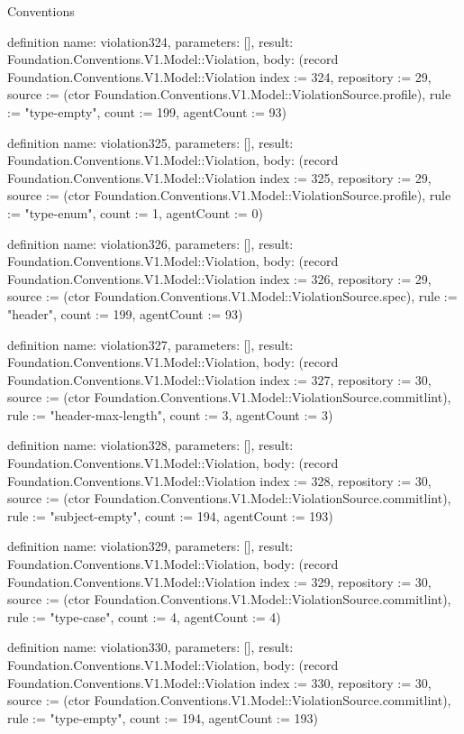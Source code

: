 \begin{lexlean}{Conventions}
\begin{semanticmodule}
definition{
  name: violation324,
  parameters: [],
  result: Foundation.Conventions.V1.Model::Violation,
  body: (record Foundation.Conventions.V1.Model::Violation {index := 324, repository := 29, source := (ctor Foundation.Conventions.V1.Model::ViolationSource.profile), rule := "type-empty", count := 199, agentCount := 93})
}

definition{
  name: violation325,
  parameters: [],
  result: Foundation.Conventions.V1.Model::Violation,
  body: (record Foundation.Conventions.V1.Model::Violation {index := 325, repository := 29, source := (ctor Foundation.Conventions.V1.Model::ViolationSource.profile), rule := "type-enum", count := 1, agentCount := 0})
}

definition{
  name: violation326,
  parameters: [],
  result: Foundation.Conventions.V1.Model::Violation,
  body: (record Foundation.Conventions.V1.Model::Violation {index := 326, repository := 29, source := (ctor Foundation.Conventions.V1.Model::ViolationSource.spec), rule := "header", count := 199, agentCount := 93})
}

definition{
  name: violation327,
  parameters: [],
  result: Foundation.Conventions.V1.Model::Violation,
  body: (record Foundation.Conventions.V1.Model::Violation {index := 327, repository := 30, source := (ctor Foundation.Conventions.V1.Model::ViolationSource.commitlint), rule := "header-max-length", count := 3, agentCount := 3})
}

definition{
  name: violation328,
  parameters: [],
  result: Foundation.Conventions.V1.Model::Violation,
  body: (record Foundation.Conventions.V1.Model::Violation {index := 328, repository := 30, source := (ctor Foundation.Conventions.V1.Model::ViolationSource.commitlint), rule := "subject-empty", count := 194, agentCount := 193})
}

definition{
  name: violation329,
  parameters: [],
  result: Foundation.Conventions.V1.Model::Violation,
  body: (record Foundation.Conventions.V1.Model::Violation {index := 329, repository := 30, source := (ctor Foundation.Conventions.V1.Model::ViolationSource.commitlint), rule := "type-case", count := 4, agentCount := 4})
}

definition{
  name: violation330,
  parameters: [],
  result: Foundation.Conventions.V1.Model::Violation,
  body: (record Foundation.Conventions.V1.Model::Violation {index := 330, repository := 30, source := (ctor Foundation.Conventions.V1.Model::ViolationSource.commitlint), rule := "type-empty", count := 194, agentCount := 193})
}


\end{semanticmodule}
\end{lexlean}
